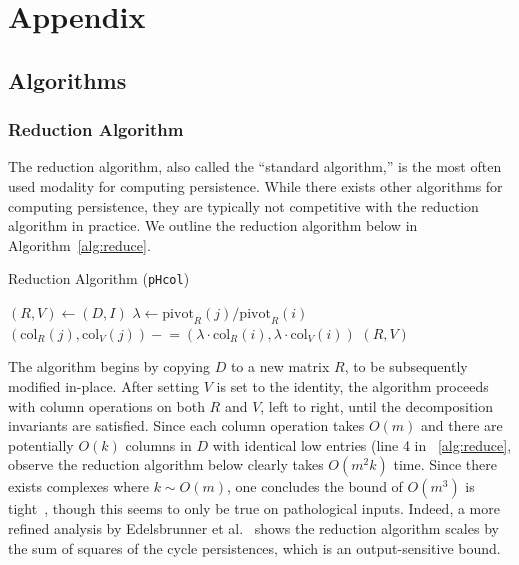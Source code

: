 \documentclass[sn-mathphys]{sn-jnl}
\begin{document}
%
%


\newpage 
\appendix
\section{Appendix}

\subsection{Algorithms}

\subsubsection{Reduction Algorithm}
The reduction algorithm, also called the ``standard algorithm,'' is the most often used modality  for computing persistence. While there exists other algorithms for computing persistence, they are typically not competitive with the reduction algorithm in practice. 
We outline the reduction algorithm below in Algorithm~\ref{alg:reduce}.
\begin{algorithm}[h!]
	\caption{Reduction Algorithm (\texttt{pHcol}) }
	\begin{algorithmic}[1]
		\State $(R, V) \gets (D, I)$
				\State $\lambda \gets \mathrm{pivot}_R(j)/\mathrm{pivot}_R(i)$
				\State $(\mathrm{col}_R(j), \mathrm{col}_V(j)) \mathrel{-}= \left ( \lambda \cdot \mathrm{col}_R(i), \lambda \cdot \mathrm{col}_V(i) \right )$
			\EndWhile
		\EndFor 
		\State \Return $(R, V)$
		\EndFunction
	\end{algorithmic}	\label{alg:reduce}
\end{algorithm}
The algorithm begins by copying $D$ to a new matrix $R$, to be subsequently modified in-place. After setting $V$ is set to the identity, the algorithm proceeds with column operations on both $R$ and $V$, left to right, until the decomposition invariants are satisfied. Since each column operation takes $O(m)$ and there are potentially $O(k)$ columns in $D$ with identical low entries (line 4 in ~\ref{alg:reduce}, observe the reduction algorithm below clearly takes $O(m^2 k)$ time. Since there exists complexes where $k \sim O(m)$, one concludes the bound of $O(m^3)$ is tight~\cite{morozov2005persistence}, though this seems to only be true on pathological inputs. Indeed, a more refined analysis by Edelsbrunner et al.~\cite{edelsbrunner2000topological} shows the reduction algorithm scales by the sum of squares of the cycle persistences, which is an output-sensitive bound. 
\end{document}
